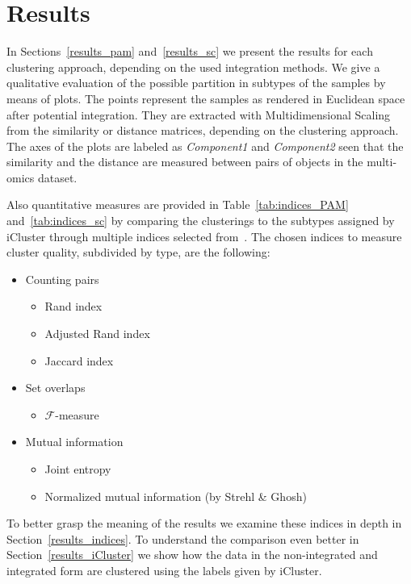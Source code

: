 \chapter{Results}

In Sections~\ref{results_pam} and~\ref{results_sc} we present the results for each clustering approach, depending on the used integration methods. We give a qualitative evaluation of the possible partition in subtypes of the samples by means of plots. The points represent the samples as rendered in Euclidean space after potential integration. They are extracted with Multidimensional Scaling from the similarity or distance matrices, depending on the clustering approach. The axes of the plots are labeled as \textit{Component1} and \textit{Component2} seen that the similarity and the distance are measured between pairs of objects in the multi-omics dataset.

Also quantitative measures are provided in Table~\ref{tab:indices_PAM} and~\ref{tab:indices_sc} by comparing the clusterings to the subtypes assigned by iCluster through multiple indices selected from~\cite{wagner2007comparing}. The chosen indices to measure cluster quality, subdivided by type, are the following:
\begin{itemize}
    \item Counting pairs
    \begin{itemize}             
        \item Rand index
        \item Adjusted Rand index
        \item Jaccard index
    \end{itemize}
    \item Set overlaps
    \begin{itemize}
        \item $\mathcal{F}$-measure
    \end{itemize}
    \item Mutual information
    \begin{itemize}
        \item Joint entropy
        \item Normalized mutual information (by Strehl \& Ghosh)
    \end{itemize}
\end{itemize}
To better grasp the meaning of the results we examine these indices in depth in Section~\ref{results_indices}. To understand the comparison even better in Section~\ref{results_iCluster} we show how the data in the non-integrated and integrated form are clustered using the labels given by iCluster.

